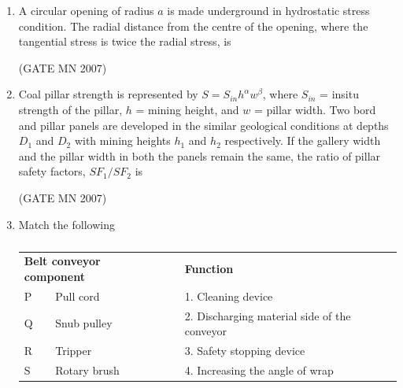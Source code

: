 \documentclass[journal]{IEEEtran}
\begin{document}
\begin{enumerate}
\item A circular opening of radius $a$ is made underground in hydrostatic stress condition. The radial distance from the centre of the opening, where the tangential stress is twice the radial stress, is


	\hfill (GATE MN 2007)
\begin{enumerate}
\end{enumerate}



\item Coal pillar strength is represented by $S = S_{in} h^\alpha w^\beta$, where $S_{in}$ = insitu strength of the pillar, $h$ = mining height, and $w$ = pillar width. Two bord and pillar panels are developed in the similar geological conditions at depths $D_1$ and $D_2$ with mining heights $h_1$ and $h_2$ respectively. If the gallery width and the pillar width in both the panels remain the same, the ratio of pillar safety factors, $SF_1/SF_2$ is


	\hfill (GATE MN 2007)
\begin{enumerate}
\end{enumerate}



\item Match the following
\begin{table}[H]
    \centering\normalsize
\begin{tabular}{llcl}
\multicolumn{2}{l}{\textbf{Belt conveyor component}} & & \textbf{Function} \\
P & Pull cord      &  & 1. Cleaning device \\
Q & Snub pulley    &  & 2. Discharging material side of the conveyor \\
R & Tripper        &  & 3. Safety stopping device \\
S & Rotary brush   &  & 4. Increasing the angle of wrap \\
\end{tabular}
\caption{}
    \label{tab:Q32}
\end{table}




\end{enumerate}
\end{document}

